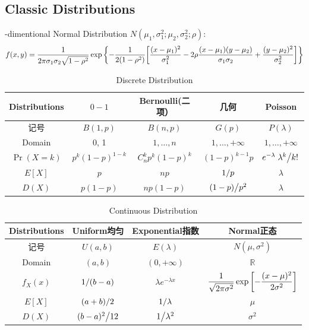 \documentclass{article}
\def\RR{\mathbb{R}}
\begin{document}
\subsection{Classic Distributions}

-dimentional Normal Distribution
$N(\mu_1,\sigma_1^2;\mu_2,\sigma_2^2;\rho)$:
\[
	f(x,y)=
	\frac{1}{2\pi\sigma_1\sigma_2\sqrt{1-\rho^2}}
	\exp\qty{
		-\frac{1}{2(1-\rho^2)}
		\qty[
			\frac{(x-\mu_1)^2}{\sigma_1^2}-
			2\rho\frac{(x-\mu_1)(y-\mu_2)}{\sigma_1\sigma_2}+
			\frac{(y-\mu_2)^2}{\sigma_2^2}
		]
	}
\]

\begin{table}[h]
	\centering
	\begin{tabular}{|c|cccc|}
		\hline
		Distributions & $0-1$ & Bernoulli(二项）& 几何 & Poisson
		\\[6pt]\hline
		记号 & $B(1,p)$ & $B(n,p)$ & $G(p)$ & $P(\lambda)$
		\\[4pt]
		Domain & 0, 1 & $1,\dots,n$ & $1,\dots,+\infty$ & $1,\dots,+\infty$
		\\[4pt]
		$\Pr(X=k)$ & $p^k(1-p)^{1-k}$ & $C_n^kp^k(1-p)^k$ & $(1-p)^{k-1}p$ & $e^{-\lambda}\flatfrac{\lambda^k}{k!}$
		\\[4pt]
		$E[X]$ & $p$ & $np$ & $\flatfrac{1}{p}$ & $\lambda$
		\\[4pt]
		$D(X)$ & $p(1-p)$ & $np(1-p)$ & $\flatfrac{(1-p)}{p^2}$ & $\lambda$
		\\\hline
	\end{tabular}
	\caption{Discrete Distribution}
\end{table}


\begin{table}[h]
	\centering
	\begin{tabular}{|c|ccc|}
		\hline
		Distributions & Uniform均匀 & Exponential指数 & Normal正态
		\\[5pt]\hline
		记号 & $U(a,b)$ & $E(\lambda)$ & $N(\mu,\sigma^2)$
		\\[5pt]
		Domain & $(a,b)$ & $(0,+\infty)$ & $\RR$
		\\[5pt]
		$f_X(x)$ & $\flatfrac{1}{(b-a)}$ & $\lambda e^{-\lambda x}$ & $\dfrac{1}{\sqrt{2\pi\sigma^2}}\exp\qty[-\dfrac{(x-\mu)^2}{2\sigma^2}]$
		\\[5pt]
		$E[X]$ & $\flatfrac{(a+b)}{2}$ & $\flatfrac{1}{\lambda}$ & $\mu$
		\\[5pt]
		$D(X)$ & $\flatfrac{(b-a)^2}{12}$ & $\flatfrac{1}{\lambda^2}$ & $\sigma^2$
		\\ \hline
	\end{tabular}
	\caption{Continuous Distribution}
\end{table}
\end{document}
